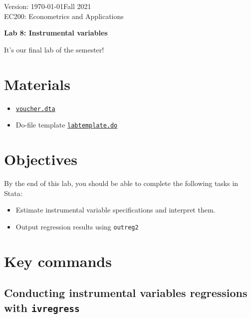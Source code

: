 \documentclass[11pt]{article}
\begin{document}
\thispagestyle{plain}
\singlespacing


Version: \today \hfill Fall 2021\\
EC200: Econometrics and Applications
\begin{center}
\Large{\textbf{Lab 8: Instrumental variables}}\\
\end{center}
\bigskip



It's our final lab of the semester! 

\hypertarget{materials}{%
\section*{Materials}\label{materials}}

\begin{itemize}
\item
  \href{https://ec200f21.netlify.app/assignment/materials/voucher.dta}{\texttt{voucher.dta}}
\item
  Do-file template
  \href{https://ec200f21.netlify.app/assignment/materials/labtemplate_f21.do}{\texttt{labtemplate.do}}
\end{itemize}

\hypertarget{objectives}{%
\section*{Objectives}\label{objectives}}

By the end of this lab, you should be able to complete the following
tasks in Stata:

\begin{itemize}
\item
  Estimate instrumental variable specifications and interpret them.
\item
  Output regression results using \texttt{outreg2}
\end{itemize}

\hypertarget{key-commands}{%
\section*{Key commands}\label{key-commands}}

\hypertarget{conducting-instrumental-variables-regressions-with-ivregress}{%
\subsection*{\texorpdfstring{Conducting instrumental variables
regressions with
\texttt{ivregress}}{Conducting instrumental variables regressions with ivregress}}\label{conducting-instrumental-variables-regressions-with-ivregress}}
\end{document}
